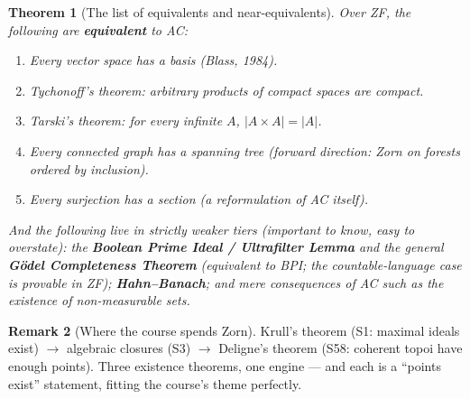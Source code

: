 \documentclass[11pt,a4paper]{article}
\newtheorem{theorem}{Theorem}[section]
\theoremstyle{definition}
\newtheorem{remark}[theorem]{Remark}
\begin{document}
\begin{theorem}[The list of equivalents and near-equivalents]\label{thm:ac-list}
Over ZF, the following are \textbf{equivalent} to AC:
\begin{enumerate}[label=(\arabic*)]
  \item Every vector space has a basis (Blass, 1984).
  \item Tychonoff's theorem: arbitrary products of compact spaces are compact.
  \item Tarski's theorem: for every infinite $A$, $|A\times A|=|A|$.
  \item Every connected graph has a spanning tree (forward direction: Zorn on forests ordered by inclusion).
  \item Every surjection has a section (a reformulation of AC itself).
\end{enumerate}
And the following live in strictly weaker tiers (important to know, easy to overstate):
the \textbf{Boolean Prime Ideal / Ultrafilter Lemma} and the general \textbf{G\"odel Completeness
Theorem} (equivalent to BPI; the countable-language case is provable in ZF); \textbf{Hahn--Banach};
and mere \emph{consequences} of AC such as the existence of non-measurable sets.
\end{theorem}

\begin{remark}[Where the course spends Zorn]
Krull's theorem (S1: maximal ideals exist) $\to$ algebraic closures (S3) $\to$ Deligne's theorem
(S58: coherent topoi have enough points). Three existence theorems, one engine --- and each is a
``points exist'' statement, fitting the course's theme perfectly.
\end{remark}

\end{document}

